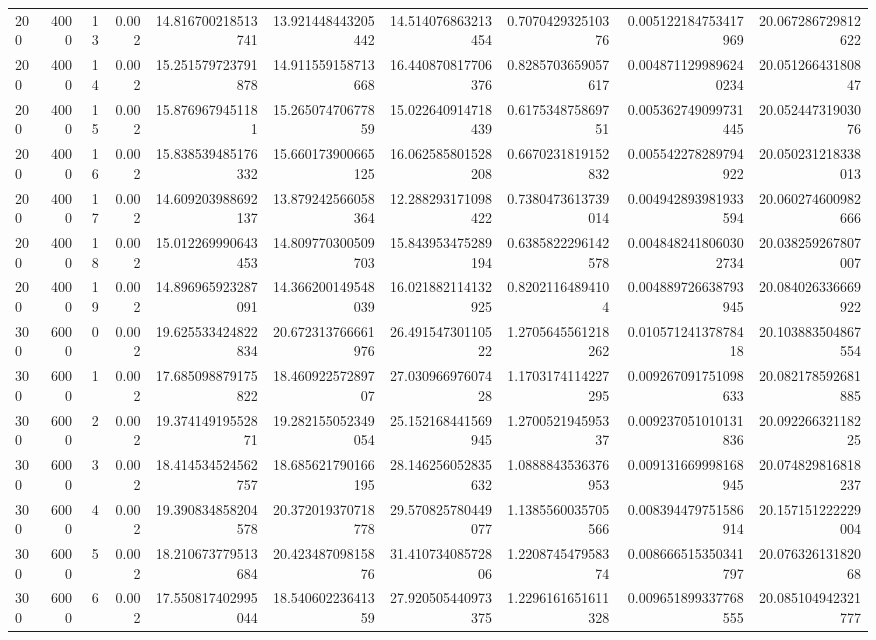 \begin{tabular}{lrrrrrrrrr}
200 & 4000 & 13 & 0.002 & 14.816700218513741 & 13.921448443205442 & 14.514076863213454 & 0.707042932510376 & 0.005122184753417969 & 20.067286729812622 \\
200 & 4000 & 14 & 0.002 & 15.251579723791878 & 14.911559158713668 & 16.440870817706376 & 0.8285703659057617 & 0.0048711299896240234 & 20.05126643180847 \\
200 & 4000 & 15 & 0.002 & 15.8769679451181 & 15.26507470677859 & 15.022640914718439 & 0.617534875869751 & 0.005362749099731445 & 20.05244731903076 \\
200 & 4000 & 16 & 0.002 & 15.838539485176332 & 15.660173900665125 & 16.062585801528208 & 0.6670231819152832 & 0.005542278289794922 & 20.050231218338013 \\
200 & 4000 & 17 & 0.002 & 14.609203988692137 & 13.879242566058364 & 12.288293171098422 & 0.7380473613739014 & 0.004942893981933594 & 20.060274600982666 \\
200 & 4000 & 18 & 0.002 & 15.012269990643453 & 14.809770300509703 & 15.843953475289194 & 0.6385822296142578 & 0.0048482418060302734 & 20.038259267807007 \\
200 & 4000 & 19 & 0.002 & 14.896965923287091 & 14.366200149548039 & 16.021882114132925 & 0.82021164894104 & 0.004889726638793945 & 20.084026336669922 \\
300 & 6000 & 0 & 0.002 & 19.625533424822834 & 20.672313766661976 & 26.49154730110522 & 1.2705645561218262 & 0.01057124137878418 & 20.103883504867554 \\
300 & 6000 & 1 & 0.002 & 17.685098879175822 & 18.46092257289707 & 27.03096697607428 & 1.1703174114227295 & 0.009267091751098633 & 20.082178592681885 \\
300 & 6000 & 2 & 0.002 & 19.37414919552871 & 19.282155052349054 & 25.152168441569945 & 1.270052194595337 & 0.009237051010131836 & 20.09226632118225 \\
300 & 6000 & 3 & 0.002 & 18.414534524562757 & 18.685621790166195 & 28.146256052835632 & 1.0888843536376953 & 0.009131669998168945 & 20.074829816818237 \\
300 & 6000 & 4 & 0.002 & 19.390834858204578 & 20.372019370718778 & 29.570825780449077 & 1.1385560035705566 & 0.008394479751586914 & 20.157151222229004 \\
300 & 6000 & 5 & 0.002 & 18.210673779513684 & 20.42348709815876 & 31.41073408572806 & 1.220874547958374 & 0.008666515350341797 & 20.07632613182068 \\
300 & 6000 & 6 & 0.002 & 17.550817402995044 & 18.54060223641359 & 27.920505440973375 & 1.2296161651611328 & 0.009651899337768555 & 20.085104942321777 \\

\end{tabular}
